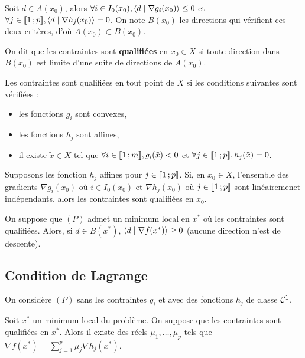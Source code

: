 	\begin{pop}
		Soit $d \in A(x_0)$, alors $\forall i \in I_0(x_0), \left\langle d \mid \nabla g_i(x_0) \right\rangle \leq 0$ et $\forall j \in \mathopen{[\![}1\mathclose{}\mathpunct{};p\mathclose{]\!]}, \left\langle d \mid \nabla h_j(x_0) \right\rangle = 0$.
		On note $B(x_0)$ les directions qui vérifient ces deux critères, d'où $A(x_0) \subset B(x_0)$.
	\end{pop}

	\begin{defn}
		On dit que les contraintes sont \textbf{qualifiées} en $x_0 \in X$ si toute direction dans $B(x_0)$ est limite d'une suite de directions de $A(x_0)$.
	\end{defn}

	\begin{pop}
		Les contraintes sont qualifiées en tout point de $X$ si les conditions suivantes sont vérifiées :
		\begin{itemize}
			\item les fonctions $g_i$ sont convexes,
			\item les fonctions $h_j$ sont affines,
			\item il existe $\tilde{x} \in X$ tel que $\forall i \in \mathopen{[\![}1\mathclose{}\mathpunct{};m\mathclose{]\!]}, g_i(\tilde{x}) < 0$ et $\forall j \in \mathopen{[\![}1\mathclose{}\mathpunct{};p\mathclose{]\!]}, h_j(\tilde{x}) = 0$.
		\end{itemize}
	\end{pop}

	\begin{pop}
		Supposons les fonction $h_j$ affines pour $j \in \mathopen{[\![}1\mathclose{}\mathpunct{};p\mathclose{]\!]}$. Si, en $x_0 \in X$, l'ensemble des gradients $\nabla g_i(x_0)$ où $i \in I_0(x_0)$ et $\nabla h_j(x_0)$ où $j \in \mathopen{[\![}1\mathclose{}\mathpunct{};p\mathclose{]\!]}$ sont linéairemenet indépendants, alors les contraintes sont qualifiées en $x_0$.
	\end{pop}

	\begin{thm}
		On suppose que $(P)$ admet un minimum local en $x^*$ où les contraintes sont qualifiées.
		Alors, si $d \in B(x^*)$, $\left\langle d \mid \nabla f(x^*) \right\rangle \geq 0$ (aucune direction n'est de descente).
	\end{thm}

\subsection{Condition de Lagrange}

	On considère $(P)$ sans les contraintes $g_i$ et avec des fonctions $h_j$ de classe $\mathcal{C}^1$.

	\begin{thm}
		Soit $x^*$ un minimum local du problème.
		On suppose que les contraintes sont qualifiées en $x^*$.
		Alors il existe des réels $\mu_1,\ldots,\mu_p$ tels que $\nabla f(x^*) = \sum_{j = 1}^p \mu_j \nabla h_j(x^*)$.
	\end{thm}

